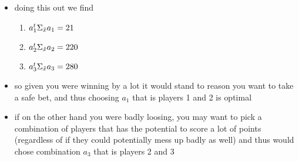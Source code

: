 \documentclass[12pt,twoside]{article}
\begin{document}
\begin{enumerate}
\begin{itemize}
\item doing this out we find 
\begin{enumerate}
  \item $a_{1}^t\Sigma_{\Tilde{x}}a_{1}=21$
  \item $a_{2}^t\Sigma_{\Tilde{x}}a_{2}=220$
  \item $a_{3}^t\Sigma_{\Tilde{x}}a_{3}=280$
\end{enumerate}
\item so given you were winning by a lot it would stand to reason you want to take a safe bet, and thus choosing $a_1$ that is players 1 and 2 is optimal
\item if on the other hand you were badly loosing, you may want to pick a combination of players that has the potential to score a lot of points (regardless of if they could potentially mess up badly as well) and thus would chose combination $a_3$ that is players 2 and 3  
\end{itemize}
\newpage



\end{enumerate}
\end{document}
